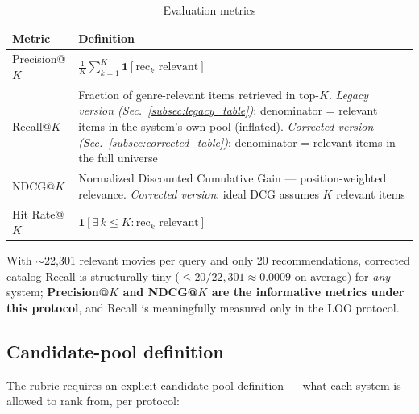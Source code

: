 \documentclass[12pt,a4paper]{article}
\begin{document}
\begin{table}[H]
\centering
\caption{Evaluation metrics}
\begin{tabular}{lp{10.5cm}}
\toprule
\textbf{Metric} & \textbf{Definition} \\
\midrule
Precision@$K$ & $\frac{1}{K}\sum_{k=1}^{K} \mathbf{1}[\text{rec}_k \text{ relevant}]$ \\[4pt]
Recall@$K$ & Fraction of genre-relevant items retrieved in top-$K$.
  \emph{Legacy version (Sec.~\ref{subsec:legacy_table})}: denominator = relevant items in the
  system's own pool (inflated).
  \emph{Corrected version (Sec.~\ref{subsec:corrected_table})}: denominator = relevant items
  in the full universe \\[4pt]
NDCG@$K$ & Normalized Discounted Cumulative Gain --- position-weighted relevance.
  \emph{Corrected version}: ideal DCG assumes $K$ relevant items \\[4pt]
Hit Rate@$K$ & $\mathbf{1}[\exists\, k \leq K : \text{rec}_k \text{ relevant}]$ \\
\bottomrule
\end{tabular}
\end{table}

With $\sim$22,301 relevant movies per query and only 20 recommendations, corrected catalog
Recall is structurally tiny ($\leq 20/22{,}301 \approx 0.0009$ on average) for \emph{any}
system; \textbf{Precision@$K$ and NDCG@$K$ are the informative metrics under this protocol},
and Recall is meaningfully measured only in the LOO protocol.

\subsection{Candidate-pool definition}
\label{subsec:candidate_pools}

The rubric requires an explicit candidate-pool definition --- what each system is allowed to
rank from, per protocol:
\end{document}
